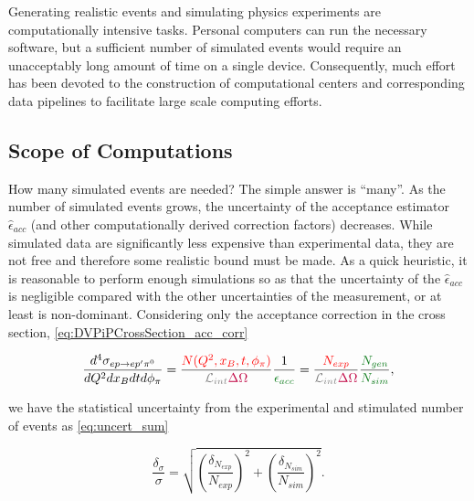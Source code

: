 Generating realistic \dvpip events and simulating physics experiments are computationally intensive tasks. Personal computers can run the necessary software, but a sufficient number of simulated events would require an unacceptably long amount of time on a single device. Consequently, much effort has been devoted to the construction of computational centers and corresponding data pipelines to facilitate large scale computing efforts. 

\subsection{Scope of Computations}

    How many simulated events are needed? The simple answer is ``many''. As the number of simulated events grows, the uncertainty of the acceptance estimator $\hat{\epsilon}_{acc}$ (and other computationally derived correction factors) decreases. While simulated data are significantly less expensive than experimental data, they are not free and therefore some realistic bound must be made. As a quick heuristic, it is reasonable to perform enough simulations so as that the uncertainty of the $\hat{\epsilon}_{acc}$ is negligible compared with the other uncertainties of the measurement, or at least is non-dominant. Considering only the acceptance correction in the cross section, \eqref{eq:DVPiPCrossSection_acc_corr}

    
     \begin{equation}\labelAndRemember{eq:DVPiPCrossSection_acc_corr}
           { \frac{    d^4\sigma_{  ep \rightarrow ep'\pi^0}   } {dQ^2dx_Bdtd\phi_{\pi}} 
                =   \frac{ \textcolor{red}{ N(Q^2,x_B,t,\phi_{\pi})}} {\Lumiint \textcolor{purple}{ \Delta \Omega}}
                \frac{1}{\textcolor{correctionfactors}{\epsilon_{acc}}} = \frac{ \textcolor{red}{ N_{exp} }} {\Lumiint \textcolor{purple}{ \Delta \Omega}}  \frac{\textcolor{correctionfactors}{N_{gen}}}{\textcolor{correctionfactors}{N_{sim}}}},
     \end{equation}     

     we have the statistical uncertainty from the experimental and stimulated number of events as \eqref{eq:uncert_sum}

    \begin{equation}\label{eq:uncert_sum}
               { 
               \frac{\delta_{\sigma}}{\sigma} = \sqrt{
                \left(\frac{\delta_{N_{exp}}}{N_{exp}} \right)^2+
                \left(\frac{\delta_{N_{sim}}}{N_{sim}} \right)^2 }               }.
         \end{equation}

